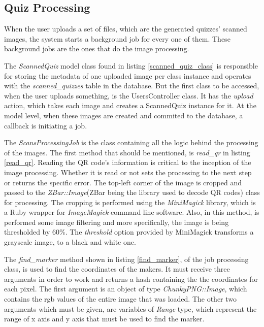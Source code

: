 \subsection{Quiz Processing}

When the user uploads a set of files, which are the generated quizzes' scanned images, the system starts a background job for every one of them. These background jobs are the ones that do the image processing. 

The \textit{ScannedQuiz} model class found in listing \ref{scanned_quiz_class} is responsible for storing the metadata of one uploaded image per class instance and operates with the \textit{scanned\_quizzes} table in the database. But the first class to be accessed, when the user uploads something, is the UsersController class. It has the \textit{upload} action, which takes each image and creates a ScannedQuiz instance for it. At the model level, when these images are created and commited to the database, a callback is initiating a job. 



The \textit{ScansProcessingJob} is the class containing all the logic behind the processing of the images. The first method that should be mentioned, is \textit{read\_qr} in listing \ref{read_qr}. Reading the QR code's information is critical to the inception of the image processing. Whether it is read or not sets the processing to the next step or returns the specific error. The top-left corner of the image is cropped and passed to the \textit{ZBar::Image}(ZBar being the library used to decode QR codes) class for processing. The cropping is performed using the \textit{MiniMagick} library, which is a Ruby wrapper for \textit{ImageMagick} command line software. Also, in this method, is performed some image filtering and more specifically, the image is being thresholded by 60\%. The \textit{threshold} option provided by MiniMagick transforms a grayscale image, to a black and white one. 



The \textit{find\_marker} method shown in listing \ref{find_marker}, of the job processing class, is used to find the coordinates of the makers. It must receive three arguments in order to work and returns a hash containing the the coordinates for each pixel. The first argument is an object of type \textit{ChunkyPNG::Image}, which contains the rgb values of the entire image that was loaded. The other two arguments which must be given, are variables of \textit{Range} type, which represent the range of x axis and y axis that must be used to find the marker.  

